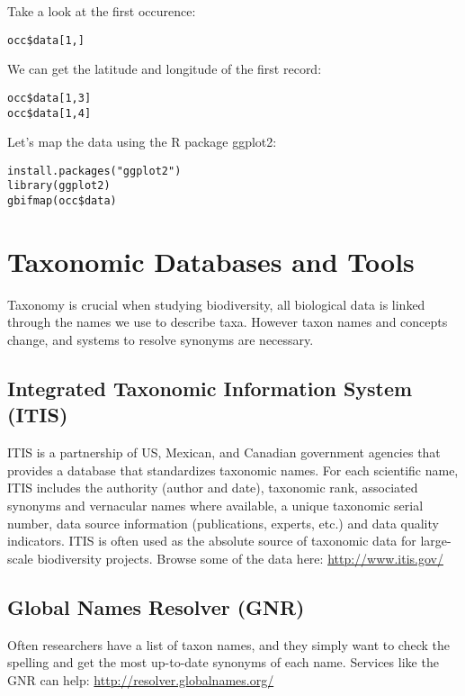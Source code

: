 \documentclass[11pt]{article}
\begin{document}
Take a look at the first occurence:

\begin{verbatim}
occ$data[1,]
\end{verbatim}

We can get the latitude and longitude of the first record:

\begin{verbatim}
occ$data[1,3]
occ$data[1,4]
\end{verbatim}

Let's map the data using the R package ggplot2:

\begin{verbatim}
install.packages("ggplot2")
library(ggplot2)
gbifmap(occ$data)
\end{verbatim}

\section{Taxonomic Databases and Tools}

Taxonomy is crucial when studying biodiversity,
all biological data is linked through the names we use to describe taxa.
However taxon names and concepts change, and systems to resolve synonyms
are necessary.

\subsection{Integrated Taxonomic Information System (ITIS)}

ITIS is a partnership of US, Mexican, and Canadian government agencies
that provides a database that standardizes taxonomic names.
For each scientific name, ITIS includes the authority (author and date), taxonomic rank, associated synonyms and vernacular names where available, a unique taxonomic serial number, data source information (publications, experts, etc.) and data quality indicators.
ITIS is often used as the absolute source of taxonomic data for large-scale biodiversity projects.
Browse some of the data here: \url{http://www.itis.gov/}

\subsection{Global Names Resolver (GNR)}

Often researchers have a list of taxon names, and they
simply want to check the spelling and get the most up-to-date synonyms 
of each name. Services like the GNR can help: \url{http://resolver.globalnames.org/}
\end{document}
